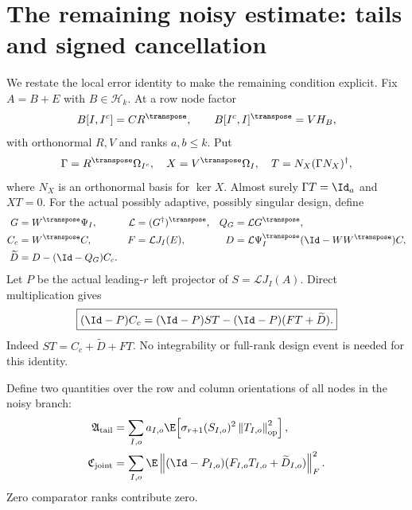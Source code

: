 \documentclass[11pt,oneside,openany,a4paper]{book}
\numberwithin{equation}{chapter}
\theoremstyle{definition}
\theoremstyle{remark}
\newcommand{\F}[1]{\left\lVert#1\right\rVert_F}
\newcommand{\op}[1]{\left\lVert#1\right\rVert_{\rm op}}
\newcommand{\HH}{\mathcal H}\newcommand{\SSS}{\mathcal S}
\begin{document}
\section{The remaining noisy estimate: tails and signed cancellation}
We restate the local error identity to make the remaining condition explicit. Fix $A=B+E$ with $B\in\HH_k$. At a row node factor
\[
 B[I,I^c]=CR^\transpose,\qquad B[I^c,I]^\transpose=VH_B,
\]
with orthonormal $R,V$ and ranks $a,b\le k$. Put
\[
 \Gamma=R^\transpose\Omega_{I^c},\quad X=V^\transpose\Omega_I,
 \quad T=N_X(\Gamma N_X)^\dagger,
\]
where $N_X$ is an orthonormal basis for $\ker X$. Almost surely $\Gamma T=\Id_a$ and $XT=0$. For the actual possibly adaptive, possibly singular design, define
\begin{align*}
 G&=W^\transpose\Psi_I,&\mathcal L&=(G^\dagger)^\transpose,&Q_G&=\mathcal L G^\transpose,\\
 C_c&=W^\transpose C,&F&=\mathcal L J_I(E),&
 D&=\mathcal L\Psi_I^\transpose(\Id-WW^\transpose)C,\\
 \widetilde D&=D-(\Id-Q_G)C_c.&
\end{align*}
Let $P$ be the actual leading-$r$ left projector of $S=\mathcal L J_I(A)$. Direct multiplication gives
\begin{equation}\label{ports:eq:signed}
 \boxed{(\Id-P)C_c=(\Id-P)ST-(\Id-P)(FT+\widetilde D).}
\end{equation}
Indeed $ST=C_c+\widetilde D+FT$. No integrability or full-rank design event is needed for this identity.

Define two quantities over the row and column orientations of all nodes in the noisy branch:
\begin{align}
 \mathfrak A_{\rm tail}
 &=\sum_{I,o}a_{I,o}\E\!\left[
 \sigma_{r+1}(S_{I,o})^2\op{T_{I,o}}^2\right],\label{ports:eq:Atail}\\
 \mathfrak C_{\rm joint}
 &=\sum_{I,o}\E\F{(\Id-P_{I,o})
       (F_{I,o}T_{I,o}+\widetilde D_{I,o})}^2.\label{ports:eq:Cjoint}
\end{align}
Zero comparator ranks contribute zero.
\end{document}
